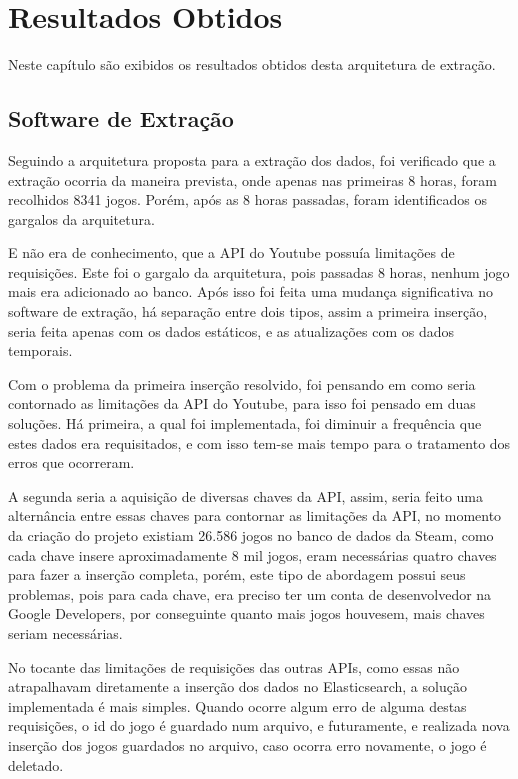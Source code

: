 \chapter[Resultados Obtidos]{Resultados Obtidos}
Neste capítulo são exibidos os resultados obtidos desta arquitetura de extração.

\section{Software de Extração}
Seguindo a arquitetura proposta para a extração dos dados, foi verificado que a extração ocorria da maneira prevista, onde apenas nas primeiras 8 horas, foram recolhidos 8341 jogos. Porém, após as 8 horas passadas, foram identificados os gargalos da arquitetura. 

E não era de conhecimento, que a API do Youtube possuía limitações de requisições. Este foi o gargalo da arquitetura, pois passadas 8 horas, nenhum jogo mais era adicionado ao banco. Após isso foi feita uma mudança significativa no software de extração, há separação entre dois tipos, assim a primeira inserção, seria feita apenas com os dados estáticos, e as atualizações com os dados temporais.

Com o problema da primeira inserção resolvido, foi pensando em como seria contornado as limitações da API do Youtube, para isso foi pensado em duas soluções. Há primeira, a qual foi implementada, foi diminuir a frequência que estes dados era requisitados, e com isso tem-se mais tempo para o tratamento dos erros que ocorreram. 

A segunda seria a aquisição de diversas chaves da API, assim, seria feito uma alternância entre essas chaves para contornar as limitações da API, no momento da criação do projeto existiam 26.586 jogos no banco de dados da Steam, como cada chave insere aproximadamente 8 mil jogos, eram necessárias quatro chaves para fazer a inserção completa, porém, este tipo de abordagem possui seus problemas, pois para cada chave, era preciso ter um conta de desenvolvedor na Google Developers, por conseguinte quanto mais jogos houvesem, mais chaves seriam necessárias.

No tocante das limitações de requisições das outras APIs, como essas não atrapalhavam diretamente a inserção dos dados no Elasticsearch, a solução implementada é mais simples. Quando ocorre algum erro de alguma destas requisições, o id do jogo é guardado num arquivo, e futuramente, e realizada nova inserção dos jogos guardados no arquivo, caso ocorra erro novamente, o jogo é deletado.	

